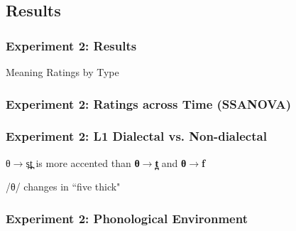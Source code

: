\documentclass{beamer}
\begin{document}
\subsection{Results}
\begin{frame}
\frametitle{Experiment 2: Results}

\begin{block}{Meaning Ratings by Type}

\end{block}

\end{frame}
\begin{frame}[shrink=5]
\frametitle{Experiment 2:  Ratings across Time (SSANOVA)}
\begin{center}

\end{center}
\end{frame}
\begin{frame}
\frametitle{Experiment 2:  L1 Dialectal vs. Non-dialectal}
\begin{center}
\begin{spacing}{2}
{\color{red} θ$\rightarrow$s̪t̪ } is more accented than \textbf{θ$\rightarrow$t̪} and \textbf{θ$\rightarrow$f} 
\end{spacing}
\begin{block}{/θ/ changes in ``five thick"}
\centering

\end{block}
\end{center}
\end{frame}
\begin{frame}[shrink=10]
\frametitle{Experiment 2:  Phonological Environment}
\begin{spacing}{2}
\centering
{}
\end{spacing}
\end{frame}
\end{document}
